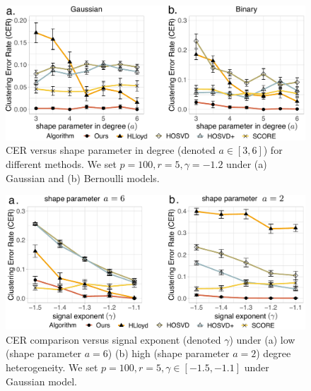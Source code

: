 \documentclass[lettersize,journal]{IEEEtran}
\theoremstyle{definition}
\theoremstyle{definition}
\begin{document}





\begin{figure}[h!]
    \centering
    \includegraphics[width=\columnwidth]{comp_theta_anno3.pdf}
    \caption{CER versus shape parameter in degree (denoted $a\in[3,6]$) for different methods. We set $p = 100, r = 5, \gamma = -1.2$ under (a) Gaussian and (b) Bernoulli models.}
    \label{fig:comp_theta}
\end{figure}



\begin{figure}[htp!]
    \centering
    \includegraphics[width=\columnwidth]{comp_gamma_theta3.pdf}
    \caption{CER comparison versus signal exponent (denoted $\gamma$) under (a) low (shape parameter $a = 6$)  (b) high (shape parameter $a = 2$) degree heterogeneity. We set $p = 100, r = 5, \gamma \in [-1.5, -1.1]$ under Gaussian model.}
    \label{fig:comp_gamma_theta}
\end{figure}
\end{document}

